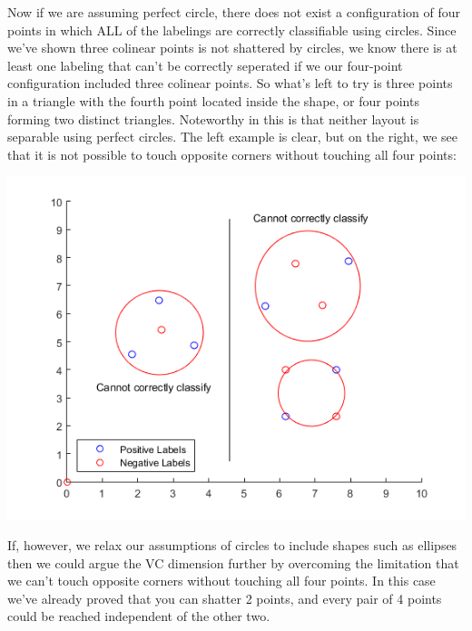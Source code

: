 \documentclass[11pt,a4paper]{article}
\begin{document}
\begin{itemize}
\begin{enumerate} [label={\alph*)}]
					Now if we are assuming perfect circle, there does not exist a configuration of four points in which ALL of the labelings are correctly classifiable using circles. Since we've shown three colinear points is not shattered by circles, we know there is at least one labeling that can't be correctly seperated if we our four-point configuration included three colinear points. So what's left to try is three points in a triangle with the fourth point located inside the shape, or four points forming two distinct triangles. Noteworthy in this is that neither layout is separable using perfect circles. The left example is clear, but on the right, we see that it is not possible to touch opposite corners without touching all four points:
					\begin{center}
						\includegraphics[width=.75\linewidth]{q3a_4}
					\end{center}
									
					If, however, we relax our assumptions of circles to include shapes such as ellipses then we could argue the VC dimension further by overcoming the limitation that we can't touch opposite corners without touching all four points. In this case we've already proved that you can shatter 2 points, and every pair of 4 points could be reached independent of the other two.
					

\end{enumerate}
\end{itemize}
\end{document}
